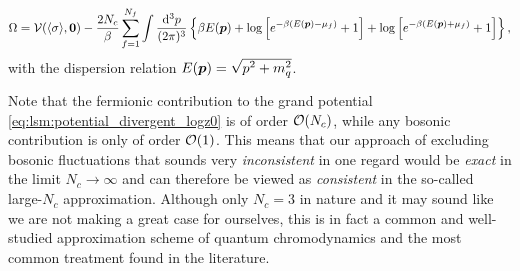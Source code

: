 \begin{equation}
\begin{split}
	\Omega = \pot(\avg{\sigma},\vec{0}) - \frac{2 N_c}{\beta} \sum_{f=1}^{N_f} \int \frac{\dif^3 p}{(2 \pi)^3} \left\{ \beta E(\vec{p}) + \log \left[ e^{-\beta (E(\vec{p}) - \mu_f)}+1 \right] + \log \left[ e^{-\beta (E(\vec{p}) + \mu_f)} + 1\right] \right\} ,
\end{split}
\label{eq:lsm:potential_divergent_logz0}
\end{equation}
with the dispersion relation $E(\vec{p}) = \sqrt{\smash[b]{p^2 + m_q^2}}$.

Note that the fermionic contribution to the grand potential \eqref{eq:lsm:potential_divergent_logz0} is of order $\bigo(N_c)$,
while any bosonic contribution is only of order $\bigo(1)$.
This means that our approach of excluding bosonic fluctuations that sounds very \emph{inconsistent} in one regard
would be \emph{exact} in the limit $N_c \rightarrow \infty$
and can therefore be viewed as \emph{consistent} in the so-called large-$N_c$ approximation.
Although only $N_c = 3$ in nature and it may sound like we are not making a great case for ourselves,
this is in fact a common and well-studied approximation scheme of quantum chromodynamics
and the most common treatment found in the literature. 

